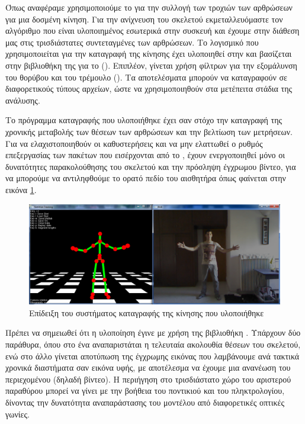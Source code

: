 Όπως αναφέραμε χρησιμοποιούμε το  για την συλλογή των τροχιών των αρθρώσεων για μια δοσμένη κίνηση. Για την ανίχνευση του σκελετού εκμεταλλευόμαστε τον αλγόριθμο που είναι υλοποιημένος εσωτερικά στην συσκευή και έχουμε στην διάθεση μας στις τρισδιάστατες συντεταγμένες των αρθρώσεων. Το λογισμικό που χρησιμοποιείται για την καταγραφή της κίνησης έχει υλοποιηθεί στην  και βασίζεται στην βιβλιοθήκη της  για το  (). Επιπλέον, γίνεται χρήση φίλτρων για την εξομάλυνση του θορύβου και του τρέμουλο (). Τα αποτελέσματα μπορούν να καταγραφούν σε διαφορετικούς τύπους αρχείων, ώστε να χρησιμοποιηθούν στα μετέπειτα στάδια της ανάλυσης.

Το πρόγραμμα καταγραφής που υλοποιήθηκε έχει σαν στόχο την καταγραφή της χρονικής μεταβολής των θέσεων των αρθρώσεων και την βελτίωση των μετρήσεων. Για να ελαχιστοποιηθούν οι καθυστερήσεις και να μην ελαττωθεί ο ρυθμός επεξεργασίας των πακέτων που εισέρχονται από το , έχουν ενεργοποιηθεί μόνο οι δυνατότητες παρακολούθησης του σκελετού και την πρόσληψη έγχρωμου βίντεο, για να μπορούμε να αντιληφθούμε το ορατό πεδίο του αισθητήρα όπως φαίνεται στην εικόνα \ref{fig:motion-capture}.

\begin{figure}[H]
    \centering
    \includegraphics[width=.9\textwidth, keepaspectratio]{fig/motion-capture.png}
    \caption{Επίδειξη του συστήματος καταγραφής της κίνησης που υλοποιήθηκε}
    \label{fig:motion-capture}
\end{figure}

Πρέπει να σημειωθεί ότι η υλοποίηση έγινε με χρήση της βιβλιοθήκη . Υπάρχουν δύο παράθυρα, όπου στο ένα αναπαριστάται η τελευταία ακολουθία θέσεων του σκελετού, ενώ στο άλλο γίνεται αποτύπωση της έγχρωμης εικόνας που λαμβάνουμε ανά τακτικά χρονικά διαστήματα σαν εικόνα υφής, με αποτέλεσμα να έχουμε μια ανανέωση του περιεχομένου (δηλαδή βίντεο). Η περιήγηση στο τρισδιάστατο χώρο του αριστερού παραθύρου μπορεί να γίνει με την βοήθεια του ποντικιού και του πληκτρολογίου, δίνοντας την δυνατότητα αναπαράστασης του μοντέλου από διαφορετικές οπτικές γωνίες.

